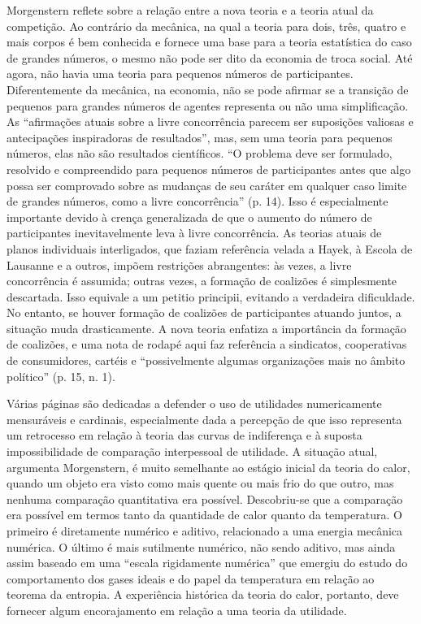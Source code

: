 \documentclass[12pt]{article}
\begin{document}
Morgenstern reflete sobre a relação entre a nova teoria e a teoria atual da competição. Ao contrário da mecânica, na qual a teoria para dois, três, quatro e mais corpos é bem conhecida e fornece uma base para a teoria estatística do caso de grandes números, o mesmo não pode ser dito da economia de troca social. Até agora, não havia uma teoria para pequenos números de participantes. Diferentemente da mecânica, na economia, não se pode afirmar se a transição de pequenos para grandes números de agentes representa ou não uma simplificação. As “afirmações atuais sobre a livre concorrência parecem ser suposições valiosas e antecipações inspiradoras de resultados”, mas, sem uma teoria para pequenos números, elas não são resultados científicos. “O problema deve ser formulado, resolvido e compreendido para pequenos números de participantes antes que algo possa ser comprovado sobre as mudanças de seu caráter em qualquer caso limite de grandes números, como a livre concorrência” (p. 14). Isso é especialmente importante devido à crença generalizada de que o aumento do número de participantes inevitavelmente leva à livre concorrência. As teorias atuais de planos individuais interligados, que faziam referência velada a Hayek, à Escola de Lausanne e a outros, impõem restrições abrangentes: às vezes, a livre concorrência é assumida; outras vezes, a formação de coalizões é simplesmente descartada. Isso equivale a um petitio principii, evitando a verdadeira dificuldade. No entanto, se houver formação de coalizões de participantes atuando juntos, a situação muda drasticamente. A nova teoria enfatiza a importância da formação de coalizões, e uma nota de rodapé aqui faz referência a sindicatos, cooperativas de consumidores, cartéis e “possivelmente algumas organizações mais no âmbito político” (p. 15, n. 1).

Várias páginas são dedicadas a defender o uso de utilidades numericamente mensuráveis e cardinais, especialmente dada a percepção de que isso representa um retrocesso em relação à teoria das curvas de indiferença e à suposta impossibilidade de comparação interpessoal de utilidade. A situação atual, argumenta Morgenstern, é muito semelhante ao estágio inicial da teoria do calor, quando um objeto era visto como mais quente ou mais frio do que outro, mas nenhuma comparação quantitativa era possível. Descobriu-se que a comparação era possível em termos tanto da quantidade de calor quanto da temperatura. O primeiro é diretamente numérico e aditivo, relacionado a uma energia mecânica numérica. O último é mais sutilmente numérico, não sendo aditivo, mas ainda assim baseado em uma “escala rigidamente numérica” que emergiu do estudo do comportamento dos gases ideais e do papel da temperatura em relação ao teorema da entropia. A experiência histórica da teoria do calor, portanto, deve fornecer algum encorajamento em relação a uma teoria da utilidade.
\end{document}
